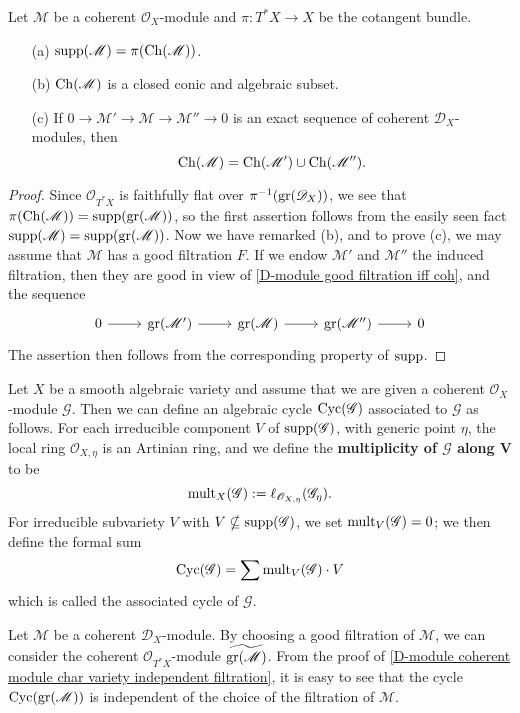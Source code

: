 \begin{proposition}\label{D-module coh characteristic variety prop}
Let $\mathscr{M}$ be a coherent $\mathscr{O}_X$-module and $\pi:T^*X\to X$ be the cotangent bundle.
\begin{enumerate}
    \item[(a)] $\mathrm{supp}(\mathscr{M})=\pi(\mathrm{Ch}(\mathscr{M}))$.
    \item[(b)] $\mathrm{Ch}(\mathscr{M})$ is a closed conic and algebraic subset.
    \item[(c)] If $0\to\mathscr{M}'\to\mathscr{M}\to\mathscr{M}''\to 0$ is an exact sequence of coherent $\mathscr{D}_X$-modules, then
    \[\mathrm{Ch}(\mathscr{M})=\mathrm{Ch}(\mathscr{M}')\cup\mathrm{Ch}(\mathscr{M}'').\] 
\end{enumerate}
\end{proposition}
\begin{proof}
Since $\mathscr{O}_{T^*X}$ is faithfully flat over $\pi^{-1}(\mathrm{gr}(\mathscr{D}_X))$, we see that $\pi(\mathrm{Ch}(\mathscr{M}))=\mathrm{supp}(\mathrm{gr}(\mathscr{M}))$, so the first assertion follows from the easily seen fact $\mathrm{supp}(\mathscr{M})=\mathrm{supp}(\mathrm{gr}(\mathscr{M}))$. Now we have remarked (b), and to prove (c), we may assume that $\mathscr{M}$ has a good filtration $F$. If we endow $\mathscr{M}'$ and $\mathscr{M}''$ the induced filtration, then they are good in view of \cref{D-module good filtration iff coh}, and the sequence
\[\begin{tikzcd}
0\ar[r]&\gr(\mathscr{M}')\ar[r]&\gr(\mathscr{M})\ar[r]&\gr(\mathscr{M}'')\ar[r]&0
\end{tikzcd}\]
The assertion then follows from the corresponding property of $\mathrm{supp}$.
\end{proof}

Let $X$ be a smooth algebraic variety and assume that we are given a coherent $\mathscr{O}_X$-module $\mathscr{G}$. Then we can define an algebraic cycle $\mathrm{Cyc}(\mathscr{G})$ associated to $\mathscr{G}$ as follows. For each irreducible component $V$ of $\mathrm{supp}(\mathscr{G})$, with generic point $\eta$, the local ring $\mathscr{O}_{X,\eta}$ is an Artinian ring, and we define the \textbf{multiplicity of $\mathscr{G}$ along $\bm{V}$} to be
\[\mathrm{mult}_X(\mathscr{G}):=\ell_{\mathscr{O}_{X,\eta}}(\mathscr{G}_\eta).\]
For irreducible subvariety $V$ with $V\nsubseteq\mathrm{supp}(\mathscr{G})$, we set $\mathrm{mult}_V(\mathscr{G})=0$; we then define the formal sum
\[\mathrm{Cyc}(\mathscr{G})=\sum \mathrm{mult}_V(\mathscr{G})\cdot V\]
which is called the associated cycle of $\mathscr{G}$.\par
Let $\mathscr{M}$ be a coherent $\mathscr{D}_X$-module. By choosing a good filtration of $\mathscr{M}$, we can consider the coherent $\mathscr{O}_{T^*X}$-module $\widetilde{\mathrm{gr}(\mathscr{M})}$. From the proof of \cref{D-module coherent module char variety independent filtration}, it is easy to see that the cycle $\mathrm{Cyc}(\mathrm{gr}(\mathscr{M}))$ is independent of the choice of the filtration of $\mathscr{M}$.

